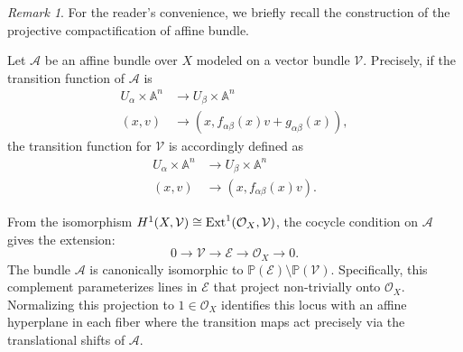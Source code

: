 \documentclass[11pt]{amsart}
\theoremstyle{remark}
\newtheorem{remark}[theorem]{Remark}
\numberwithin{equation}{section}
\begin{document}
\begin{remark}
For the reader's convenience, we briefly recall the construction of the projective compactification of affine bundle. 

Let $\mathcal{A}$ be an affine bundle over $X$ modeled on a vector bundle $\mathcal{V}$. Precisely, if the transition function of $\mathcal{A}$ is
\[
\begin{split}
    U_\alpha \times \mathbb{A}^n &\rightarrow U_\beta \times \mathbb{A}^n
    \\
    (x,v) & \rightarrow (x, f_{\alpha\beta}(x)v + g_{\alpha\beta}(x) ),
\end{split}
\]
the transition function for $\mathcal{V}$ is accordingly defined as
\[
\begin{split}
    U_\alpha \times \mathbb{A}^n &\rightarrow U_\beta \times \mathbb{A}^n
    \\
    (x,v) & \rightarrow (x, f_{\alpha\beta}(x)v ).
\end{split}
\]

From the isomorphism $H^1(X, \mathcal{V}) \cong {\rm Ext}^1(\mathcal{O}_X, \mathcal{V})$, the cocycle condition on $\mathcal{A}$ gives the extension:
\[
    0 \rightarrow \mathcal{V} \rightarrow \mathcal{E} \rightarrow \mathcal{O}_X \rightarrow 0.
\]
The bundle $\mathcal{A}$ is canonically isomorphic to $\mathbb{P}(\mathcal{E}) \setminus \mathbb{P}(\mathcal{V})$. Specifically, this complement parameterizes lines in $\mathcal{E}$ that project non-trivially onto $\mathcal{O}_X$. Normalizing this projection to $1 \in \mathcal{O}_X$ identifies this locus with an affine hyperplane in each fiber where the transition maps act precisely via the translational shifts of $\mathcal{A}$.
\end{remark}
\end{document}
